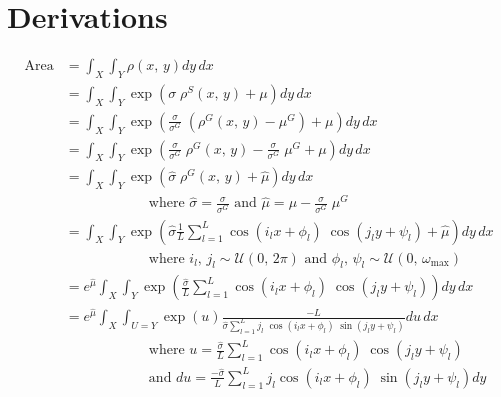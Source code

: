 \documentclass[12pt,dvipsnames]{report}
\begin{document}
\iffalse
\pagebreak
\chapter{Derivations} \label{ch:derive}

\begin{align}
\text{Area} &= \int_X \int_Y \rho\left( x,\, y \right) dy \, dx \\
&= \int_X \int_Y \exp\left( \sigma \; \rho^S \left( x,\, y \right) + \mu \right) dy \, dx \\
&= \int_X \int_Y \exp\left( \frac{\sigma}{\sigma^G} \; \left( \rho^G\left( x,\, y \right) - \mu^G \right) + \mu \right) dy \, dx \\
&= \int_X \int_Y \exp\left( \frac{\sigma}{\sigma^G} \; \rho^G\left( x,\, y \right) - \frac{\sigma}{\sigma^G} \; \mu^G + \mu \right) dy \, dx \\
&= \int_X \int_Y \exp\left( \hat{\sigma} \; \rho^G\left( x,\, y \right) + \hat{\mu} \right) dy \, dx \\
& \hspace{1in} \text{where $\hat{\sigma} = \frac{\sigma}{\sigma^G}$ and $\hat{\mu} = \mu - \frac{\sigma}{\sigma^G} \; \mu^G$} \nonumber \\
&= \int_X \int_Y \exp\left( \hat{\sigma} \frac{1}{L} \sum_{l = 1}^L \cos\left( i_l x + \phi_l \right) \; \cos\left( j_l y + \psi_l \right) + \hat{\mu} \right) dy \, dx \\
& \hspace{1in} \text{where $i_l,\, j_l \sim \mathcal{U}\left( 0,\, 2\pi \right)$ and $\phi_l,\, \psi_l \sim \mathcal{U}\left( 0,\, \omega_{\max} \right)$} \nonumber \\
&= e^{\hat{\mu}} \int_X \int_Y \exp\left( \frac{\hat{\sigma}}{L} \sum_{l=1}^L \cos\left( i_l x + \phi_l \right) \; \cos\left( j_l y + \psi_l \right) \right) dy \, dx \\
&= e^{\hat{\mu}} \int_X \int_{U=Y} \exp\left( u \right) \frac{-L}{\hat{\sigma} \sum_{l=1}^L j_l \; \cos\left( i_l x + \phi_l \right) \; \sin\left( j_l y + \psi_l \right)} du \, dx \\
& \hspace{1in} \text{where $u = \frac{\hat{\sigma}}{L} \sum_{l=1}^L \cos\left( i_l x + \phi_l \right) \; \cos\left( j_l y + \psi_l \right)$} \nonumber \\
& \hspace{1in} \text{and $du = \frac{-\hat{\sigma}}{L} \sum_{l=1}^L j_l \cos\left( i_l x + \phi_l \right) \; \sin\left( j_l y + \psi_l \right) dy$} \nonumber \\

\end{align}
\end{document}

